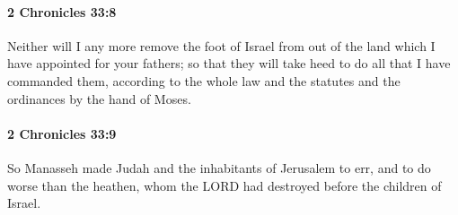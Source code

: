 		\paragraph{2 Chronicles 33:8} %
			\label{2CHRONICLES-33-8}

			Neither will I any more remove the foot of Israel from out of the land which I have appointed for your fathers; so that they will take heed to do all that I have commanded them, according to the whole law and the statutes and the ordinances by the hand of Moses.


		\paragraph{2 Chronicles 33:9} %
			\label{2CHRONICLES-33-9}

			So Manasseh made Judah and the inhabitants of Jerusalem to err, and to do worse than the heathen, whom the LORD had destroyed before the children of Israel.

